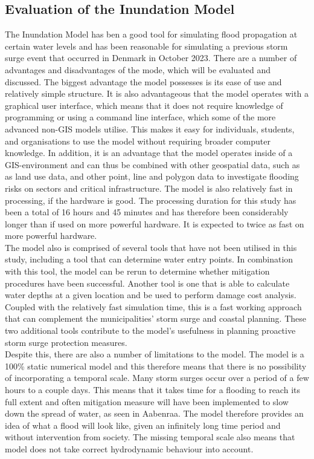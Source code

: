 \subsection{Evaluation of the Inundation Model}
The Inundation Model has ben a good tool for simulating flood propagation at certain water levels and has been reasonable for simulating a previous storm surge event that occurred in Denmark in October 2023. There are a number of advantages and disadvantages of the mode, which will be evaluated and discussed.
The biggest advantage the model possesses is its ease of use and relatively simple structure. It is also advantageous that the model operates with a graphical user interface, which means that it does not require knowledge of programming or using a command line interface, which some of the more advanced non-GIS models utilise. This makes it easy for individuals, students, and organisations to use the model without requiring broader computer knowledge. In addition, it is an advantage that the model operates inside of a GIS-environment and can thus be combined with other geospatial data, such as as land use data, and other point, line and polygon data to investigate flooding risks on sectors and critical infrastructure. 
The model is also relatively fast in processing, if the hardware is good. The processing duration for this study has been a total of 16 hours and 45 minutes and has therefore been considerably longer than if used on more powerful hardware. It is expected to twice as fast on more powerful hardware.\\

The model also is comprised of several tools that have not been utilised in this study, including a tool that can determine water entry points. In combination with this tool, the model can be rerun to determine whether mitigation procedures have been successful. Another tool is one that is able to calculate water depths at a given location and be used to perform damage cost analysis. Coupled with the relatively fast simulation time, this is a fast working approach that can complement the municipalities' storm surge and coastal planning. These two additional tools contribute to the model's usefulness in planning proactive storm surge protection measures.\\

Despite this, there are also a number of limitations to the model. The model is a 100\% static numerical model and this therefore means that there is no possibility of incorporating a temporal scale. Many storm surges occur over a period of a few hours to a couple days. This means that it takes time for a flooding to reach its full extent and often mitigation measure will have been implemented to slow down the spread of water, as seen in Aabenraa. The model therefore provides an idea of what a flood will look like, given an infinitely long time period and without intervention from society. The missing temporal scale also means that model does not take correct hydrodynamic behaviour into account. 

